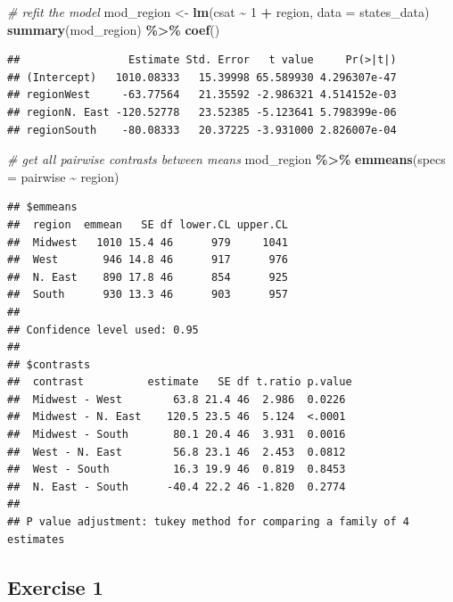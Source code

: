 \documentclass[
]{book}
\newenvironment{Shaded}{\begin{snugshade}}{\end{snugshade}}
\newcommand{\CommentTok}[1]{\textcolor[rgb]{0.56,0.35,0.01}{\textit{#1}}}
\newcommand{\DataTypeTok}[1]{\textcolor[rgb]{0.13,0.29,0.53}{#1}}
\newcommand{\DecValTok}[1]{\textcolor[rgb]{0.00,0.00,0.81}{#1}}
\newcommand{\KeywordTok}[1]{\textcolor[rgb]{0.13,0.29,0.53}{\textbf{#1}}}
\newcommand{\NormalTok}[1]{#1}
\newcommand{\OperatorTok}[1]{\textcolor[rgb]{0.81,0.36,0.00}{\textbf{#1}}}
\newcommand{\StringTok}[1]{\textcolor[rgb]{0.31,0.60,0.02}{#1}}
\begin{document}
\begin{Shaded}
\begin{Highlighting}[]
  \CommentTok{\# refit the model}
\NormalTok{  mod\_region \textless{}{-}}\StringTok{ }\KeywordTok{lm}\NormalTok{(csat }\OperatorTok{\textasciitilde{}}\StringTok{ }\DecValTok{1} \OperatorTok{+}\StringTok{ }\NormalTok{region, }\DataTypeTok{data =}\NormalTok{ states\_data)}
  \KeywordTok{summary}\NormalTok{(mod\_region) }\OperatorTok{\%\textgreater{}\%}\StringTok{ }\KeywordTok{coef}\NormalTok{()}
\end{Highlighting}
\end{Shaded}

\begin{verbatim}
##                 Estimate Std. Error   t value     Pr(>|t|)
## (Intercept)   1010.08333   15.39998 65.589930 4.296307e-47
## regionWest     -63.77564   21.35592 -2.986321 4.514152e-03
## regionN. East -120.52778   23.52385 -5.123641 5.798399e-06
## regionSouth    -80.08333   20.37225 -3.931000 2.826007e-04
\end{verbatim}

\begin{Shaded}
\begin{Highlighting}[]
  \CommentTok{\# get all pairwise contrasts between means}
\NormalTok{  mod\_region }\OperatorTok{\%\textgreater{}\%}
\StringTok{      }\KeywordTok{emmeans}\NormalTok{(}\DataTypeTok{specs =}\NormalTok{ pairwise }\OperatorTok{\textasciitilde{}}\StringTok{ }\NormalTok{region)}
\end{Highlighting}
\end{Shaded}

\begin{verbatim}
## $emmeans
##  region  emmean   SE df lower.CL upper.CL
##  Midwest   1010 15.4 46      979     1041
##  West       946 14.8 46      917      976
##  N. East    890 17.8 46      854      925
##  South      930 13.3 46      903      957
## 
## Confidence level used: 0.95 
## 
## $contrasts
##  contrast          estimate   SE df t.ratio p.value
##  Midwest - West        63.8 21.4 46  2.986  0.0226 
##  Midwest - N. East    120.5 23.5 46  5.124  <.0001 
##  Midwest - South       80.1 20.4 46  3.931  0.0016 
##  West - N. East        56.8 23.1 46  2.453  0.0812 
##  West - South          16.3 19.9 46  0.819  0.8453 
##  N. East - South      -40.4 22.2 46 -1.820  0.2774 
## 
## P value adjustment: tukey method for comparing a family of 4 estimates
\end{verbatim}

\hypertarget{exercise-1-1}{%
\subsection{Exercise 1}\label{exercise-1-1}}
\end{document}
